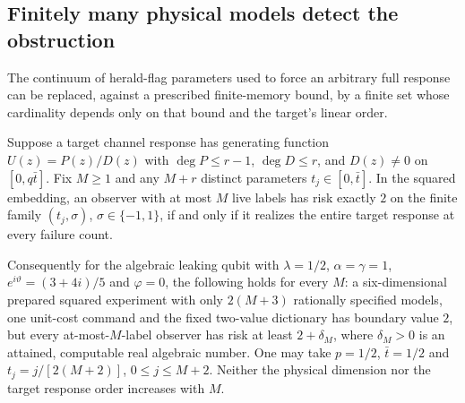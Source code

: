 \subsection{Finitely many physical models detect the obstruction}
The continuum of herald-flag parameters used to force an arbitrary full response can be replaced, against a prescribed finite-memory bound, by a finite set whose cardinality depends only on that bound and the target's linear order.

\begin{theorem}\label{thm:r70-finite-tests}
Suppose a target channel response has generating function $U(z)=P(z)/D(z)$ with
$\deg P\le r-1$, $\deg D\le r$, and $D(z)\ne0$ on $[0,q\bar t]$. Fix $M\ge1$ and any $M+r$ distinct parameters $t_j\in[0,\bar t]$. In the squared embedding, an observer with at most $M$ live labels has risk exactly $2$ on the finite family $(t_j,\sigma)$, $\sigma\in\{-1,1\}$, if and only if it realizes the entire target response at every failure count.

Consequently for the algebraic leaking qubit with $\lambda=1/2$, $\alpha=\gamma=1$, $e^{i\vartheta}=(3+4i)/5$ and $\varphi=0$, the following holds for every $M$: a six-dimensional prepared squared experiment with only $2(M+3)$ rationally specified models, one unit-cost command and the fixed two-value dictionary has boundary value $2$, but every at-most-$M$-label observer has risk at least $2+\delta_M$, where $\delta_M>0$ is an attained, computable real algebraic number. One may take $p=1/2$, $\bar t=1/2$ and $t_j=j/[2(M+2)]$, $0\le j\le M+2$. Neither the physical dimension nor the target response order increases with $M$.
\end{theorem}
